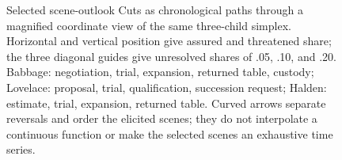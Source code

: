 \begin{figure}[htbp]
\endgroup
\caption{Selected scene-outlook Cuts as chronological paths through a magnified
coordinate view of the same three-child simplex. Horizontal and vertical
position give assured and threatened share; the three diagonal guides give
unresolved shares of .05, .10, and .20. Babbage: negotiation, trial, expansion, returned table,
custody; Lovelace: proposal, trial, qualification, succession request; Halden:
estimate, trial, expansion, returned table. Curved arrows separate reversals
and order the elicited scenes; they do not interpolate a continuous function or
make the selected scenes an exhaustive time series.}
\label{fig:book-scene-simplex}
\end{figure}
